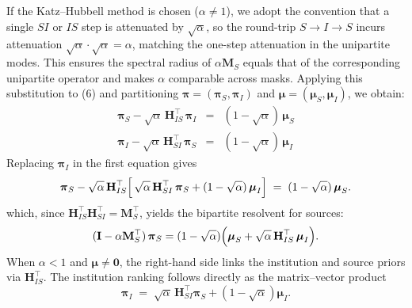 If the Katz--Hubbell method is chosen ($\alpha \ne 1$), we adopt the convention that a single $SI$ or $IS$ step is attenuated by $\sqrt{\alpha}$, so the round-trip $S\to I\to S$ incurs attenuation $\sqrt{\alpha}\cdot\sqrt{\alpha}=\alpha$, matching the one-step attenuation in the unipartite modes. This ensures the spectral radius of $\alpha\mathbf{M}_S$ equals that of the corresponding unipartite operator and makes $\alpha$ comparable across masks.
Applying this substitution to (6) and partitioning $\boldsymbol{\pi} = (\boldsymbol{\pi}_S, \boldsymbol{\pi}_I)$
and $\boldsymbol{\mu} = (\boldsymbol{\mu}_S, \boldsymbol{\mu}_I)$, we obtain:\begin{eqnarray*}
	\boldsymbol{\pi}_S - \sqrt{\alpha}\,\mathbf{H}_{IS}^{\top}\,\boldsymbol{\pi}_I & = & (1-\sqrt{\alpha})\,\boldsymbol{\mu}_S \\
	\boldsymbol{\pi}_I - \sqrt{\alpha}\,\mathbf{H}_{SI}^{\top}\,\boldsymbol{\pi}_S & = & (1-\sqrt{\alpha})\,\boldsymbol{\mu}_I
\end{eqnarray*}
Replacing $\boldsymbol{\pi}_I$ in the first equation gives
\[
\boldsymbol{\pi}_S - \sqrt{\alpha}\,\mathbf{H}_{IS}^{\top}\Bigl[\,\sqrt{\alpha}\,\mathbf{H}_{SI}^{\top}\,\boldsymbol{\pi}_S + (1-\sqrt{\alpha})\,\boldsymbol{\mu}_I\Bigr] \;=\; (1-\sqrt{\alpha})\,\boldsymbol{\mu}_S .
\]
\noindent which, since
\(\mathbf{H}_{IS}^{\top}\mathbf{H}_{SI}^{\top}  = \mathbf{M}_S^{\top}\),  yields the bipartite resolvent for sources:
\[
(\mathbf{I} - \alpha \mathbf{M}_S^{\top})\,\boldsymbol{\pi}_S = (1-\sqrt{\alpha})\Bigl(\boldsymbol{\mu}_S + \sqrt{\alpha}\,\mathbf{H}_{IS}^{\top}\,\boldsymbol{\mu}_I\Bigr) .
\]
When $\alpha<1$ and $\boldsymbol{\mu}\ne\mathbf{0}$, the right-hand side links the institution and source priors via $\mathbf{H}_{IS}^\top$. The institution ranking follows directly as the matrix--vector product
\begin{equation}
  \boldsymbol{\pi}_I
  \;=\;
  \sqrt{\alpha}\,\mathbf{H}_{SI}^\top\boldsymbol{\pi}_S+(1-\sqrt{\alpha})\boldsymbol{\mu}_I.
  \label{eq:kh_inst}
\end{equation}

